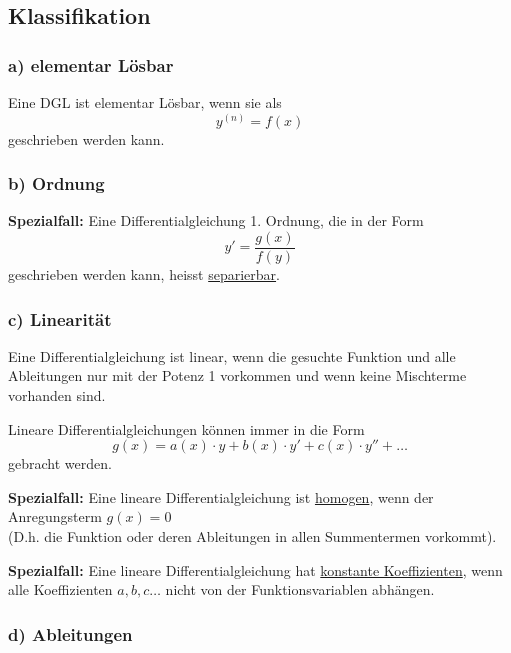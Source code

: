 \subsection{Klassifikation}
\subsubsection*{a) elementar Lösbar}
Eine DGL ist elementar Lösbar, wenn sie als 
\begin{equation*}
    y^{\left( n \right)} = f(x)
\end{equation*}
geschrieben werden kann.

\subsubsection*{b) Ordnung}

\textbf{Spezialfall:} Eine Differentialgleichung 1. Ordnung, die in der Form 
\begin{equation*}
    y' = \frac{g(x)}{f(y)}
\end{equation*}
geschrieben werden kann, heisst \underline{separierbar}.

\subsubsection*{c) Linearität}
Eine Differentialgleichung ist linear, wenn die gesuchte Funktion und alle
Ab\-lei\-tun\-gen nur mit der Potenz 1 vorkommen und wenn keine Mischterme vorhanden
sind.

Lineare Differentialgleichungen können immer in die Form 
\begin{equation*}
    g(x) = a(x)\cdot y + b(x) \cdot y' + c(x)\cdot y'' + \ldots
\end{equation*}
gebracht werden.

\textbf{Spezialfall:} Eine lineare Differentialgleichung ist
\underline{homogen}, wenn der Anregungsterm $g(x)=0$ \\
(D.h. die Funktion oder deren Ableitungen in allen Summentermen vorkommt).

\textbf{Spezialfall:} Eine lineare Differentialgleichung hat \underline{%
konstante Koeffizienten}, wenn alle Koeffizienten $a,b,c\ldots$ nicht von der
Funktionsvariablen abhängen.

\subsubsection*{d) Ableitungen}

